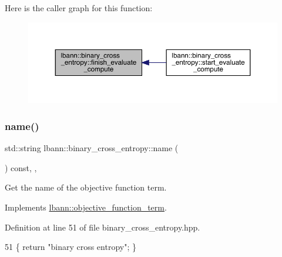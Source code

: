 Here is the caller graph for this function\+:\nopagebreak
\begin{figure}[H]
\begin{center}
\leavevmode
\includegraphics[width=350pt]{classlbann_1_1binary__cross__entropy_acedb440a94926866c4de4fdeeb5165bd_icgraph}
\end{center}
\end{figure}
\mbox{\label{classlbann_1_1binary__cross__entropy_a6a068d51808a54a2a6dd913650f60569}} 
\subsubsection{\texorpdfstring{name()}{name()}}
{\footnotesize\ttfamily std\+::string lbann\+::binary\+\_\+cross\+\_\+entropy\+::name (\begin{DoxyParamCaption}{ }\end{DoxyParamCaption}) const\hspace{0.3cm}{\ttfamily [inline]}, {\ttfamily [override]}, {\ttfamily [virtual]}}

Get the name of the objective function term. 

Implements \hyperlink{classlbann_1_1objective__function__term_a964fbfad3dd0434aa8f32c5fedf1079a}{lbann\+::objective\+\_\+function\+\_\+term}.



Definition at line 51 of file binary\+\_\+cross\+\_\+entropy.\+hpp.


\begin{DoxyCode}
51 \{ \textcolor{keywordflow}{return} \textcolor{stringliteral}{"binary cross entropy"}; \}
\end{DoxyCode}
\mbox{\label{classlbann_1_1binary__cross__entropy_aff599d9d615b2c7ffa66b0dbc9555c0f}} 
